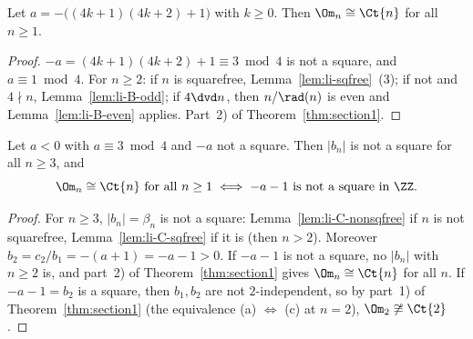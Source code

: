 \begin{theorem}
  \label{thm:li-B}
  \leanok
  Let $a = -\bigl((4k+1)(4k+2) + 1\bigr)$ with $k \ge 0$. Then $\Om_n \cong \Ct{n}$ for all
  $n \ge 1$.
\end{theorem}
\begin{proof}
  \leanok
  $-a = (4k+1)(4k+2) + 1 \equiv 3 \bmod 4$ is not a square, and $a \equiv 1 \bmod 4$. For
  $n \ge 2$: if $n$ is squarefree, Lemma~\ref{lem:li-sqfree}~(3); if not and $4 \nmid n$,
  Lemma~\ref{lem:li-B-odd}; if $4 \dvd n$, then $n/\rad(n)$ is even and Lemma~\ref{lem:li-B-even}
  applies. Part~2) of Theorem~\ref{thm:section1}.
\end{proof}

\begin{theorem}
  \label{thm:li-C}
  \leanok
  Let $a < 0$ with $a \equiv 3 \bmod 4$ and $-a$ not a square. Then $|b_n|$ is not a square for
  all $n \ge 3$, and
  \[ \Om_n \cong \Ct{n} \text{ for all } n \ge 1 \iff -a - 1 \text{ is not a square in } \ZZ. \]
\end{theorem}
\begin{proof}
  \leanok
  For $n \ge 3$, $|b_n| = \beta_n$ is not a square: Lemma~\ref{lem:li-C-nonsqfree} if $n$ is not
  squarefree, Lemma~\ref{lem:li-C-sqfree} if it is (then $n > 2$). Moreover
  $b_2 = c_2/b_1 = -(a+1) = -a - 1 > 0$. If $-a - 1$ is not a square, no $|b_n|$ with $n \ge 2$
  is, and part~2) of Theorem~\ref{thm:section1} gives $\Om_n \cong \Ct{n}$ for all $n$. If
  $-a - 1 = b_2$ is a square, then $b_1, b_2$ are not $2$-independent, so by part~1) of
  Theorem~\ref{thm:section1} (the equivalence (a) $\Leftrightarrow$ (c) at $n = 2$),
  $\Om_2 \not\cong \Ct{2}$.
\end{proof}

